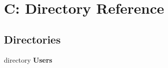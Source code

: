 \section{C\-: Directory Reference}
\label{dir_e6bb53534ac0e427887cf7a94c0c004e}
\subsection*{Directories}
\begin{DoxyCompactItemize}
\item 
directory {\bf Users}
\end{DoxyCompactItemize}
